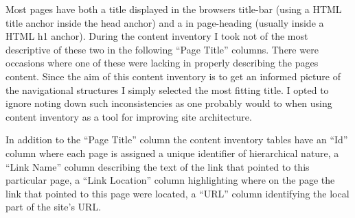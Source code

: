 Most pages have both a title displayed in the browsers title-bar (using a
HTML title anchor inside the head anchor) and a in page-heading (usually inside
a HTML h1 anchor). During the content inventory I took not of the most
descriptive of these two in the following ``Page Title'' columns. There were
occasions where one of these were lacking in properly describing the pages
content. Since the aim of this content inventory is to get an informed picture
of the navigational structures I simply selected the most fitting title.
I opted to ignore noting down such inconsistencies as one probably would to
when using content inventory as a tool for improving site architecture.

In addition to the ``Page Title'' column the content inventory tables have an
``Id'' column where each page is assigned a unique identifier of hierarchical
nature, a ``Link Name'' column describing the text of the link that pointed to
this particular page, a ``Link Location'' column highlighting where on the
page the link that pointed to this page were located, a ``URL'' column
identifying the local part of the site's URL.

\setlength{}
  \let\LTright\LTleft

